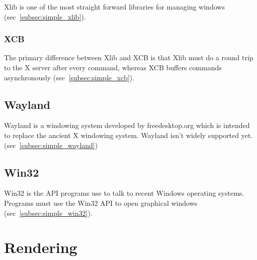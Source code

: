 \documentclass{article}
\begin{document}
Xlib is one of the most straight forward libraries for managing windows
(sec~\ref{subsec:simple_xlib}).

\subsubsection{XCB}
\label{subsubsec:xcb}

The primary difference between Xlib and XCB is that Xlib must do a round trip
to the X server after every command,
whereas XCB buffers commands asynchronously (sec~\ref{subsec:simple_xcb}).


\subsection{Wayland}
\label{subsec:wayland}

Wayland is a windowing system developed by freedesktop.org which is intended to
replace the ancient X windowing system.
Wayland isn't widely supported yet.
(sec~\ref{subsec:simple_wayland})


\subsection{Win32}
\label{subsec:win32}

Win32 is the API programs use to talk to recent Windows operating systems.
Programs must use the Win32 API to open graphical windows
(sec~\ref{subsec:simple_win32}).


\pagebreak
\section{Rendering}
\label{sec:rendering}

\end{document}
